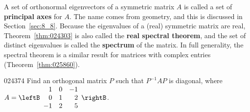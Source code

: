 \noindent A set of orthonormal eigenvectors of a symmetric matrix $A$ is called a set of \textbf{principal axes} for $A$. The name comes from geometry, and this is discussed in Section~\ref{sec:8_8}. Because the eigenvalues of a (real) symmetric matrix are real, Theorem~\ref{thm:024303} is also called the \textbf{real spectral theorem}, and the set of distinct eigenvalues is called the \textbf{spectrum} of the matrix. In full generality, the spectral theorem is a similar result for matrices with complex entries (Theorem~\ref{thm:025860}).


\begin{example}{}{024374}
Find an orthogonal matrix $P$ such that $P^{-1}AP$ is diagonal, where $A = \leftB \begin{array}{rrr}
1 & 0 & -1 \\
0 & 1 & 2 \\
-1 & 2 & 5 
\end{array}\rightB$.


\end{example}
